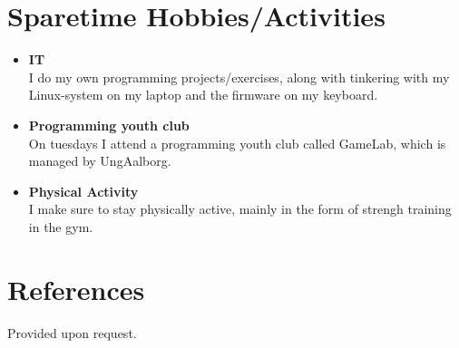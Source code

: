\documentclass{article}
\begin{document}
    \section*{Sparetime Hobbies/Activities}
    \begin{itemize}\setlength\itemsep{0.5em}
        \item[] \textbf{IT}\\
            I do my own programming projects/exercises, along with tinkering
            with my Linux-system on my laptop and the firmware on my keyboard.
        \item[] \textbf{Programming youth club}\\
            On tuesdays I attend a programming youth club called GameLab, which is managed by
            UngAalborg.
        \item[] \textbf{Physical Activity}\\
            I make sure to stay physically active, mainly in the form of strengh training in the
            gym.
    \end{itemize}

    \section*{References}
    Provided upon request.

\end{document}
